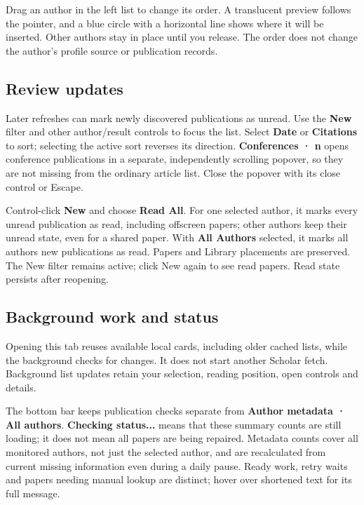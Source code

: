 \documentclass[10pt,letterpaper,oneside]{scrreprt}
\begin{document}
Drag an author in the left list to change its order. A translucent preview follows the pointer, and a blue circle with a horizontal line shows where it will be inserted. Other authors stay in place until you release. The order does not change the author's profile source or publication records.

\subsection{Review updates}\label{review-updates}

Later refreshes can mark newly discovered publications as unread. Use the \textbf{New} filter and other author/result controls to focus the list. Select \textbf{Date} or \textbf{Citations} to sort; selecting the active sort reverses its direction. \textbf{Conferences · n} opens conference publications in a separate, independently scrolling popover, so they are not missing from the ordinary article list. Close the popover with its close control or Escape.

Control-click \textbf{New} and choose \textbf{Read All}. For one selected author, it marks every unread publication as read, including offscreen papers; other authors keep their unread state, even for a shared paper. With \textbf{All Authors} selected, it marks all authors\textquotesingle{} new publications as read. Papers and Library placements are preserved. The New filter remains active; click New again to see read papers. Read state persists after reopening.

\subsection{Background work and status}\label{background-work-and-status}

Opening this tab reuses available local cards, including older cached lists, while the background checks for changes. It does not start another Scholar fetch. Background list updates retain your selection, reading position, open controls and details.

The bottom bar keeps publication checks separate from \textbf{Author metadata · All authors}. \textbf{Checking status...} means that these summary counts are still loading; it does not mean all papers are being repaired. Metadata counts cover all monitored authors, not just the selected author, and are recalculated from current missing information even during a daily pause. Ready work, retry waits and papers needing manual lookup are distinct; hover over shortened text for its full message.
\end{document}
